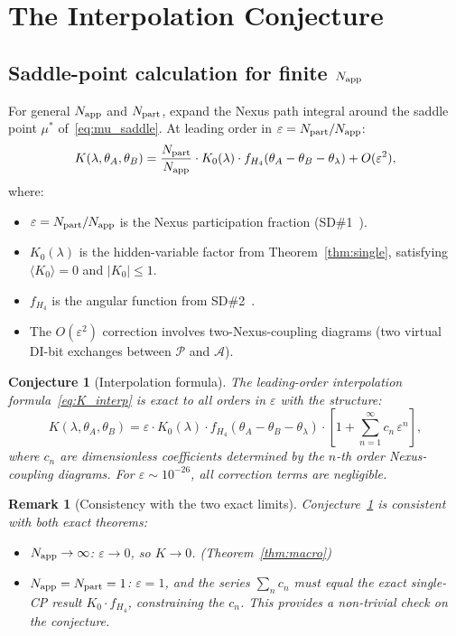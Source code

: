 \documentclass[11pt,letterpaper]{article}
\newtheorem{conjecture}[theorem]{Conjecture}
\newtheorem{remark}[theorem]{Remark}
\newcommand{\eps}{\varepsilon}
\newcommand{\Napp}{N_{\rm app}}
\newcommand{\Npart}{N_{\rm part}}
\begin{document}
\section{The Interpolation Conjecture}
\label{sec:interpolation}

\subsection{Saddle-point calculation for finite $\Napp$}

For general $\Napp$ and $\Npart$, expand the Nexus path integral
around the saddle point $\mu^*$ of~\eqref{eq:mu_saddle}.  At
leading order in $\eps = \Npart/\Napp$:
\begin{equation}
K(\lambda,\theta_A,\theta_B)
= \frac{\Npart}{\Napp}
  \cdot K_0(\lambda)
  \cdot f_{H_4}(\theta_A - \theta_B - \theta_\lambda)
  + O(\eps^2),
\label{eq:K_interp}
\end{equation}
where:
\begin{itemize}
\item $\eps = \Npart/\Napp$ is the Nexus participation fraction
  (SD\#1~\citep{cpp_sd1}).
\item $K_0(\lambda)$ is the hidden-variable factor from
  Theorem~\ref{thm:single}, satisfying $\langle K_0\rangle = 0$
  and $|K_0| \leq 1$.
\item $f_{H_4}$ is the angular function from SD\#2~\citep{cpp_sd2}.
\item The $O(\eps^2)$ correction involves two-Nexus-coupling
  diagrams (two virtual DI-bit exchanges between $\mathcal{P}$ and
  $\mathcal{A}$).
\end{itemize}

\begin{conjecture}[Interpolation formula]
\label{conj:interpolation}
The leading-order interpolation formula~\eqref{eq:K_interp} is
exact to all orders in $\eps$ with the structure:
\begin{equation}
K(\lambda,\theta_A,\theta_B)
= \eps \cdot K_0(\lambda) \cdot f_{H_4}(\theta_A-\theta_B-\theta_\lambda)
  \cdot \left[1 + \sum_{n=1}^{\infty} c_n\,\eps^n\right],
\label{eq:K_full}
\end{equation}
where $c_n$ are dimensionless coefficients determined by the
$n$-th order Nexus-coupling diagrams.  For $\eps \sim 10^{-26}$,
all correction terms are negligible.
\end{conjecture}

\begin{remark}[Consistency with the two exact limits]
Conjecture~\ref{conj:interpolation} is consistent with both
exact theorems:
\begin{itemize}
\item $\Napp \to \infty$: $\eps \to 0$, so $K \to 0$.
  \checkmark (Theorem~\ref{thm:macro})
\item $\Napp = \Npart = 1$: $\eps = 1$, and the series
  $\sum_n c_n$ must equal the exact single-CP result
  $K_0\cdot f_{H_4}$, constraining the $c_n$.  This provides
  a non-trivial check on the conjecture.
\end{itemize}
\end{remark}
\end{document}
